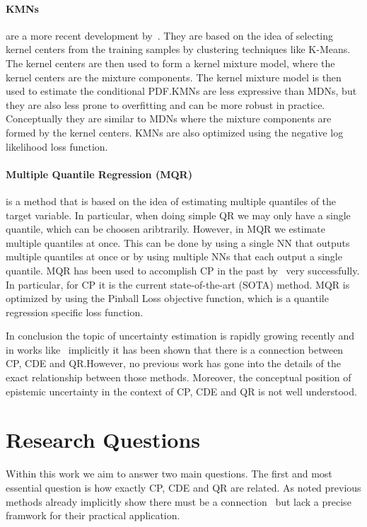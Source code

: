 \paragraph{KMNs} are a more recent development by~\cite{ambrogioni2017kernel}. They are based on the idea of selecting kernel centers from the training samples by clustering techniques like K-Means. The kernel centers are then used to form a kernel mixture model, where the kernel centers are the mixture components. The kernel mixture model is then used to estimate the conditional PDF.\@ KMNs are less expressive than MDNs, but they are also less prone to overfitting and can be more robust in practice. Conceptually they are similar to MDNs where the mixture components are formed by the kernel centers. KMNs are also optimized using the negative log likelihood loss function.

\paragraph{Multiple Quantile Regression (MQR)} is a method that is based on the idea of estimating multiple quantiles of the target variable. In particular, when doing simple QR we may only have a single quantile, which can be choosen aribtrarily. However, in MQR we estimate multiple quantiles at once. This can be done by using a single NN that outputs multiple quantiles at once or by using multiple NNs that each output a single quantile. MQR has been used to accomplish CP in the past by~\cite{sesia2021conformal} very successfully. In particular, for CP it is the current state-of-the-art (SOTA) method. MQR is optimized by using the Pinball Loss objective function, which is a quantile regression specific loss function.

In conclusion the topic of uncertainty estimation is rapidly growing recently and in works like~\cite{chernozhukov2021distributional} implicitly it has been shown that there is a connection between CP, CDE and QR.\@ However, no previous work has gone into the details of the exact relationship between those methods. Moreover, the conceptual position of epistemic uncertainty in the context of CP, CDE and QR is not well understood.

\section{Research Questions}\label{sec:questions}

Within this work we aim to answer two main questions. The first and most essential question is how exactly CP, CDE and QR are related. As noted previous methods already implicitly show there must be a connection~\cite{sesia2021conformal,chernozhukov2021distributional,chung2020beyond} but lack a precise framwork for their practical application.

